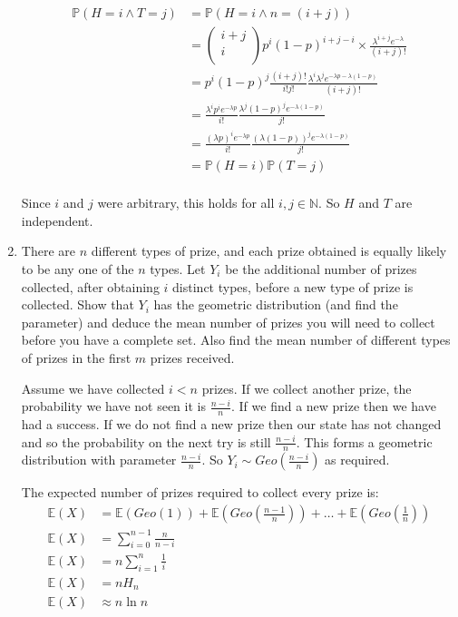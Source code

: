 \documentclass[10pt,\jkfside,a4paper]{article}
\begin{document}
\begin{enumerate}
\[
\begin{split}
\mathbb{P}(H=i \wedge T=j) &= \mathbb{P}(H=i \wedge n=(i + j)) \\
&= \begin{pmatrix} i + j \\ i \\ \end{pmatrix} p^i (1 - p)^{i + j - i} \times \frac{\lambda^{i + j}e^{-\lambda}}{(i + j)
!} \\
&= p^i (1 - p)^j \frac{(i + j)!}{i!j!} \frac{\lambda^i \lambda^j e^{-\lambda p - \lambda (1 - p)}}{(i + j)!} \\
&= \frac{\lambda^i p^i e^{-\lambda p}}{i!} \frac{\lambda^j (1 - p)^j e^{-\lambda(1 - p)}}{j!} \\
&= \frac{(\lambda p)^i e^{-\lambda p}}{i!} \frac{(\lambda(1 - p))^j e^{-\lambda(1 - p)}}{j!} \\
&= \mathbb{P}(H = i)\mathbb{P}(T = j) \\
\end{split}
\]

Since $i$ and $j$ were arbitrary, this holds for all $i, j \in \mathbb{N}$.
So $H$ and $T$ are independent.

\item

There are $n$ different types of prize, and each prize obtained is equally likely
to be any one of the $n$ types.
Let $Y_i$ be the additional number of prizes collected, after obtaining $i$ distinct
types, before a new type of prize is collected.
Show that $Y_i$ has the geometric distribution (and find the parameter) and deduce
the mean number of prizes you will need to collect before you have a complete set.
Also find the mean number of different types of prizes in the first $m$ prizes
received.

Assume we have collected $i < n$ prizes.
If we collect another prize, the probability we have not seen it is $\frac{n - i}{n}$.
If we find a new prize then we have had a success.
If we do not find a new prize then our state has not changed and so the probability on the
next try is still $\frac{n - i}{n}$.
This forms a geometric distribution with parameter $\frac{n - i}{n}$.
So $Y_i \sim Geo\left( \frac{n - i}{n} \right)$ as required.

The expected number of prizes required to collect every prize is:
\[
\begin{split}
\mathbb{E}(X) &= \mathbb{E}(Geo(1)) + \mathbb{E}\left(Geo \left( \frac{n - 1}{n} \right) \right) + \dots +
\mathbb{E}\left( Geo\left(\frac{1}{n} \right) \right) \\
\mathbb{E}(X) &= \sum^{n - 1}_{i=0} \frac{n}{n - i} \\
\mathbb{E}(X) &= n\sum^{n}_{i=1} \frac{1}{i} \\
\mathbb{E}(X) &= nH_n \\
\mathbb{E}(X) &\approx n\ln n \\
\end{split}
\]


\end{enumerate}
\end{document}
